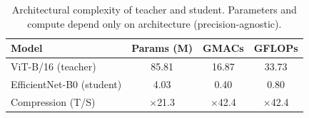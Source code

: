 \begin{table}[h]
\centering
\caption{Architectural complexity of teacher and student. Parameters and compute depend only on architecture (precision-agnostic).}
\label{tab:complexity_arch}
\begin{tabular}{lccc}
\toprule
Model & Params (M) & GMACs & GFLOPs \\
\midrule
ViT-B/16 (teacher) & 85.81 & 16.87 & 33.73 \\
EfficientNet-B0 (student) & 4.03 & 0.40 & 0.80 \\
\midrule
Compression (T/S) & $\times$21.3 & $\times$42.4 & $\times$42.4 \\
\bottomrule
\end{tabular}
\end{table}
